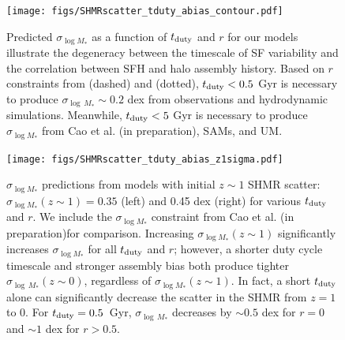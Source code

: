 \documentclass[12pt, letterpaper, preprint, tighten]{aastex62}
\newcommand{\edt}[1]{{\color{dred}{\bf} #1}}
\newcommand{\cao}{Cao et al. (in preparation)}
\newcommand{\tduty}{t_{\rm duty}}
\newcommand{\siglogm}{\sigma_{\log M_*}}
\begin{document}
\begin{figure}
\begin{center}
\texttt{[image: figs/SHMRscatter\_tduty\_abias\_contour.pdf]}
    \caption{
    \edt{Predicted $\siglogm$ as a function of $\tduty$ and $r$ for our
    models illustrate the degeneracy between the timescale of SF variability and
    the correlation between SFH and halo assembly history. Based on $r$ constraints
    from \cite{tinker2018b} (dashed) and \cite{behroozi2018} (dotted), $\tduty < 0.5$ Gyr
    is necessary to produce $\sigma_{\log\,M_*} \sim 0.2$ dex from observations and
    hydrodynamic simulations. Meanwhile, $\tduty < 5$ Gyr is necessary to produce
    $\siglogm$ from Cao et al. (in preparation), SAMs, and UM.}
    }
\label{fig:r_tduty}
\end{center}
\end{figure}

\begin{figure}
\begin{center}
    \texttt{[image: figs/SHMRscatter\_tduty\_abias\_z1sigma.pdf]}
    \caption{\edt{$\siglogm$ predictions from models with initial $z\sim1$ SHMR 
    scatter: $\siglogm(z\sim1) = 0.35$ (left) and 0.45 dex (right) for various 
    $\tduty$ and $r$. We include the $\siglogm$ constraint from \cao for comparison.
    Increasing $\siglogm(z\sim1)$ significantly increases $\siglogm$ for all 
    $\tduty$ and $r$; however, a shorter duty cycle timescale and stronger assembly 
    bias both produce tighter $\sigma_{\log\,M_*}(z\sim0)$, regardless of $\siglogm(z\sim1)$.
    In fact, a short $\tduty$ alone can significantly decrease the scatter in the 
    SHMR from $z=1$ to 0. For $\tduty=0.5$~Gyr, $\sigma_{\log\,M_*}$ decreases by 
    $\sim 0.5$ dex for $r=0$ and $\sim 1$ dex for $r > 0.5$. 
    }}
\label{fig:sM_duty_abias_z1}
\end{center}
\end{figure}

\end{document}

